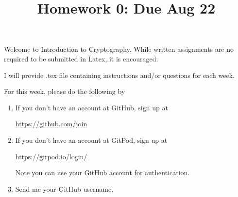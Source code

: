 \documentclass[12pt]{amsart}
\theoremstyle{definition}
\begin{document}
\title{Homework 0: Due Aug 22}

\maketitle

Welcome to Introduction to Cryptography. While written assignments are no required to be 
submitted in Latex, it is encouraged. 

I will provide .tex file containing instructions and/or questions for each week. 

For this week, please do the following by

\begin{enumerate}
	\item If you don't have an account at GitHub, sign up at 
		\begin{center}
			\href{https://github.com/join}{https://github.com/join}
		\end{center}
		
	\item If you don't have an account at GitPod, sign up at 
		\begin{center}
			\href{https://gitpod.io/login/}{https://gitpod.io/login/}
		\end{center}
	Note you can use your GitHub account for authentication. 
			
	\item Send me your GitHub username. 
\end{enumerate}
\end{document}
